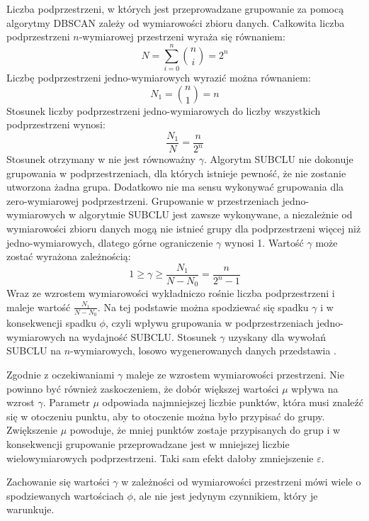Liczba podprzestrzeni, w których jest przeprowadzane grupowanie za pomocą algorytmy DBSCAN zależy od wymiarowości zbioru danych. Całkowita liczba podprzestrzeni $ n $-wymiarowej przestrzeni wyraża się równaniem:
\begin{equation}
	N = \displaystyle\sum_{i=0}^{n} \binom{n}{i} = 2^n
\end{equation}
Liczbę podprzestrzeni jedno-wymiarowych wyrazić można równaniem:
\begin{equation}
	N_1 = \binom{n}{1} = n
\end{equation}
Stosunek liczby podprzestrzeni jedno-wymiarowych do liczby wszystkich podprzestrzeni wynosi:
\begin{equation}
	\label{eq:odc:subspaces-to-subspaces-1d-count-ratio}
	\frac{N_1}{N} = \frac{n}{2^n}
\end{equation}
Stosunek otrzymany w   nie jest równoważny $ \gamma $. Algorytm SUBCLU nie dokonuje grupowania w podprzestrzeniach, dla których istnieje pewność, że nie zostanie utworzona żadna grupa. Dodatkowo nie ma sensu wykonywać grupowania dla zero-wymiarowej podprzestrzeni. Grupowanie w przestrzeniach jedno-wymiarowych w algorytmie SUBCLU jest zawsze wykonywane, a niezależnie od wymiarowości zbioru danych mogą nie istnieć grupy dla podprzestrzeni więcej niż jedno-wymiarowych, dlatego górne ograniczenie $ \gamma $ wynosi 1. Wartość $ \gamma $ może zostać wyrażona zależnością:
\begin{equation}
	\label{eq:odc:subclu_1d_nd_subspaces_count_ratio}
	1 \ge \gamma \ge \frac{N_1}{N-N_0} = \frac{n}{2^n-1}
\end{equation}
Wraz ze wzrostem wymiarowości wykładniczo rośnie liczba podprzestrzeni i maleje wartość $ \frac{N_1}{N-N_0} $. Na tej podstawie można spodziewać się spadku $ \gamma $ i w konsekwencji spadku $ \phi $, czyli wpływu grupowania w podprzestrzeniach jedno-wymiarowych na wydajność SUBCLU. Stosunek $ \gamma $ uzyskany dla wywołań SUBCLU na $ n $-wymiarowych, losowo wygenerowanych danych przedstawia .



Zgodnie z oczekiwaniami $ \gamma $ maleje ze wzrostem wymiarowości przestrzeni. Nie powinno być również zaskoczeniem, że dobór większej wartości $ \mu $ wpływa na wzrost $ \gamma $. Parametr $ \mu $ odpowiada najmniejszej liczbie punktów, która musi znaleźć się w otoczeniu punktu, aby to otoczenie można było przypisać do grupy. Zwiększenie $ \mu $ powoduje, że mniej punktów zostaje przypisanych do grup i w konsekwencji grupowanie przeprowadzane jest w mniejszej liczbie wielowymiarowych podprzestrzeni. Taki sam efekt dałoby zmniejszenie $ \varepsilon $.\par
Zachowanie się wartości $ \gamma $ w zależności od wymiarowości przestrzeni mówi wiele o spodziewanych wartościach $ \phi $, ale nie jest jedynym czynnikiem, który je warunkuje. 

